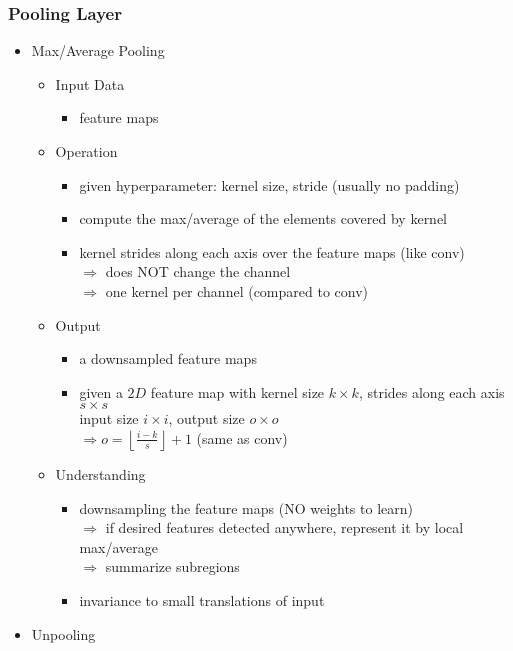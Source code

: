 \subsubsection{Pooling Layer}
\begin{itemize}
\item Max/Average Pooling
	\begin{itemize}
	\item Input Data
		\begin{itemize}
		\item feature maps
		\end{itemize}
	\item Operation
		\begin{itemize}
		\item given hyperparameter: kernel size, stride (usually no padding)
		\item compute the max/average of the elements covered by kernel
		\item kernel strides along each axis over the feature maps (like conv) \\
		$\Rightarrow$ does NOT change the channel \\
		$\Rightarrow$ one kernel per channel (compared to conv)
		\end{itemize}
	\item Output
		\begin{itemize}
		\item a downsampled feature maps
		\item given a $2D$ feature map with kernel size $k \times k$, strides along each axis $s\times s$ \\
		input size $i\times i$, output size $o\times o$ \\
		$\Rightarrow o = \left\lfloor \frac {i-k} {s} \right\rfloor + 1$ (same as conv)
		\end{itemize}
	\item Understanding
		\begin{itemize}
		\item downsampling the feature maps (NO weights to learn) \\ 
		$\Rightarrow$ if desired features detected anywhere, represent it by local max/average \\
		$\Rightarrow$ summarize subregions
		\item invariance to small translations of input
		\end{itemize}
	\end{itemize}

\item Unpooling


\end{itemize}

